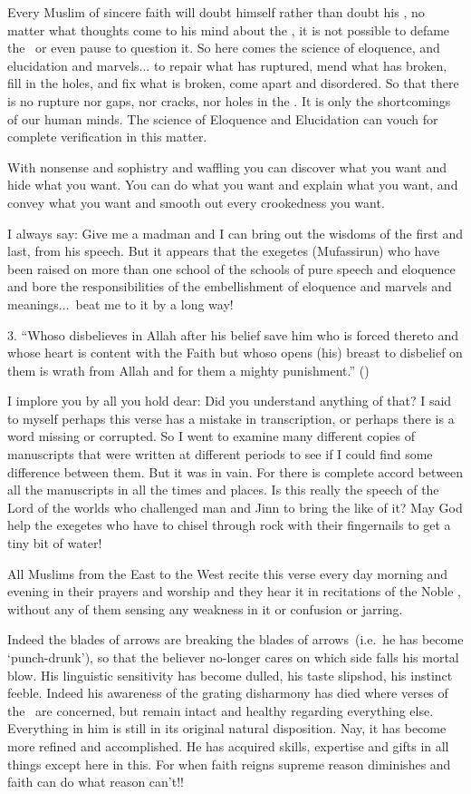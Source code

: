 \documentclass[12pt]{memoir}
\begin{document}
Every Muslim of sincere faith will doubt himself rather than doubt his \Quran,
no matter what thoughts come to his mind about the \Quran,
it is not possible to defame the \Quran\ or even pause to question it.
So here comes the science of eloquence, and elucidation and marvels...
to repair what has ruptured, mend what has broken, fill in the holes,
and fix what is broken, come apart and disordered.
So that there is no rupture nor gaps, nor cracks, nor holes in the \Quran.
It is only the shortcomings of our human minds.
The science of Eloquence and Elucidation can vouch
for complete verification in this matter.

With nonsense and sophistry and waffling you can discover what you want
and hide what you want. You can do what you want and explain what you want,
and convey what you want and smooth out every crookedness you want.

I always say: Give me a madman and I can bring out the wisdoms of the first
and last, from his speech.
But it appears that the exegetes (Mufassirun) who have been raised
on more than one school of the schools of pure speech and eloquence
and bore the responsibilities of the embellishment of eloquence
and marvels and meanings...\ beat me to it by a long way!

3. “Whoso disbelieves in Allah after his belief save him who is forced thereto
and whose heart is content with the Faith but whoso opens (his) breast
to disbelief on them is wrath from Allah and for them a mighty punishment.”
()

I implore you by all you hold dear: Did you understand anything of that?
I said to myself perhaps this verse has a mistake in transcription,
or perhaps there is a word missing or corrupted.
So I went to examine many different copies of manuscripts that were written
at different periods to see if I could find some difference between them.
But it was in vain.
For there is complete accord between all the manuscripts
in all the times and places.
Is this really the speech of the Lord of the worlds who challenged man and Jinn
to bring the like of it?
May God help the exegetes who have to chisel through rock
with their fingernails to get a tiny bit of water!

All Muslims from the East to the West recite this verse every day morning and
evening in their prayers and worship and they hear it in recitations
of the Noble \Quran, without any of them sensing any weakness
in it or confusion or jarring.

Indeed the blades of arrows are breaking
the blades of arrows\fnmarksym[*]\ (i.e.\ he has become ‘punch-drunk’),
so that the believer no-longer cares on which side falls his mortal blow.
His linguistic sensitivity has become dulled,
his taste slipshod, his instinct feeble.
Indeed his awareness of the grating disharmony
has died where verses of the \Quran\ are concerned,
but remain intact and healthy regarding everything else.
Everything in him is still in its original natural disposition.
Nay, it has become more refined and accomplished.
He has acquired skills, expertise and gifts in all things except here in this.
For when faith reigns supreme reason diminishes
and faith can do what reason can’t!!
\end{document}
